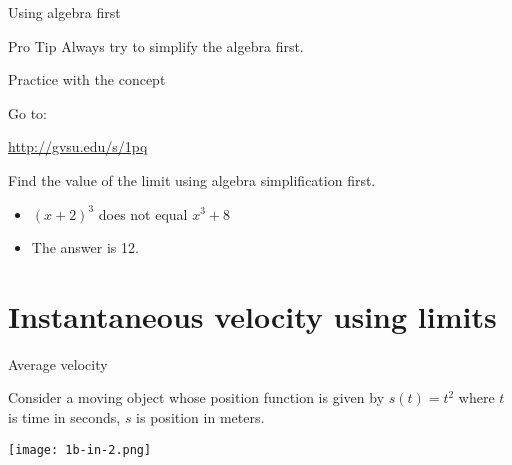 \documentclass[10pt]{beamer}
\begin{document}
\begin{frame}{Using algebra first}
    \begin{block}{Pro Tip}
    Always try to simplify the algebra first. 
    \end{block}
    
\end{frame}

\begin{frame}{Practice with the concept}
    
    Go to: 
    
    \begin{center}
        \url{http://gvsu.edu/s/1pq}
    \end{center}
    
Find the value of the limit using algebra simplification first. 

\begin{itemize}
    \item $(x+2)^3$ does not equal $x^3 + 8$
    \item The answer is 12. 
\end{itemize}
    
\end{frame}

\section[Instantaneous velocity using limits]{Instantaneous velocity using limits}

\begin{frame}{Average velocity}

Consider a moving object whose position function is given by $s(t) = t^2$ where $t$ is time in seconds, $s$ is position in meters. 

\begin{center}
    \texttt{[image: 1b-in-2.png]}
\end{center}

\end{frame}
\end{document}

